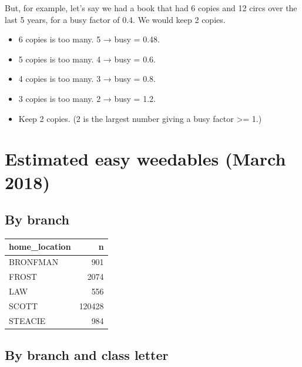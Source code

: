 \documentclass[11pt]{article}
\begin{document}
But, for example, let's say we had a book that had 6 copies and 12 circs over the last 5 years, for a busy factor of 0.4.  We would keep 2 copies.

\begin{itemize}
\item 6 copies is too many.  5 → busy = 0.48.
\item 5 copies is too many.  4 → busy = 0.6.
\item 4 copies is too many.  3 → busy = 0.8.
\item 3 copies is too many.  2 → busy = 1.2.
\item Keep 2 copies.  (2 is the largest number giving a busy factor >= 1.)
\end{itemize}

\section*{Estimated easy weedables (March 2018)}
\label{sec:orgacb3c9c}

\subsection*{By branch}
\label{sec:orgc28f5a8}

\begin{center}
\begin{tabular}{lr}
home\_location & n\\
\hline
BRONFMAN & 901\\
FROST & 2074\\
LAW & 556\\
SCOTT & 120428\\
STEACIE & 984\\
\end{tabular}
\end{center}

\subsection*{By branch and class letter}
\label{sec:org05e8041}
\end{document}
